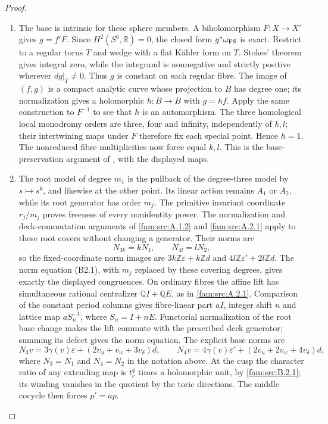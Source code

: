 \begin{proof}
\begin{enumerate}[label=\arabic*.,leftmargin=*]
\item The base is intrinsic for these sphere members. A biholomorphism $F:X\to X'$ gives $g=f'F$. Since $H^2(S^6,\mathbb R)=0$, the closed form $g^*\omega_{\rm FS}$ is exact. Restrict to a regular torus $T$ and wedge with a flat K\"ahler form on $T$. Stokes' theorem gives integral zero, while the integrand is nonnegative and strictly positive wherever $dg|_T\ne0$. Thus $g$ is constant on each regular fibre. The image of $(f,g)$ is a compact analytic curve whose projection to $B$ has degree one; its normalization gives a holomorphic $h:B\to B$ with $g=hf$. Apply the same construction to $F^{-1}$ to see that $h$ is an automorphism. The three homological local monodromy orders are three, four and infinity, independently of $k,l$; their intertwining maps under $F$ therefore fix each special point. Hence $h=1$. The nonreduced fibre multiplicities now force equal $k,l$. This is the base-preservation argument of \cite[Proposition~4.7, pp.~14--15]{ViaclovskyLog2026}, with the displayed maps.

\item The root model of degree $m_1$ is the pullback of the degree-three model by $s\mapsto s^k$, and likewise at the other point. Its linear action remains $A_1$ or $A_2$, while its root generator has order $m_j$. The primitive invariant coordinate $r_j/m_j$ proves freeness of every nonidentity power. The normalization and deck-commutation arguments of \ref{fam:src:A.1.2} and \ref{fam:src:A.2.1} apply to these root covers without changing a generator. Their norms are
\[
 N_{3k}=kN_1,\qquad N_{4l}=lN_2,
\]
so the fixed-coordinate norm images are $3k\mathbb Z\varepsilon+k\mathbb Zd$ and $4l\mathbb Z\varepsilon'+2l\mathbb Zd$. The norm equation (B2.1), with $m_j$ replaced by these covering degrees, gives exactly the displayed congruences. On ordinary fibres the affine lift has simultaneous rational centralizer
$\mathbb Q I+\mathbb Q E$, as in \cref{fam:src:A.2.1}.
Comparison of the constant period columns gives fibre-linear part $aI$,
integer shift $n$ and lattice map $aS_n^{-1}$, where $S_n=I+nE$.
Functorial normalization of the root base change makes the lift commute
with the prescribed deck generator; summing its defect gives the norm
equation. The explicit base norms are
\[
 N_3v=3\gamma(v)\varepsilon+(2v_u+v_w+3v_\delta)d,\qquad
 N_4v=4\gamma(v)\varepsilon'+(2v_u+2v_w+4v_\delta)d,
\]
where $N_3=N_1$ and $N_4=N_2$ in the notation above.
At the cusp the character ratio of any extending map is $t_c^q$ times
a holomorphic unit, by \cref{fam:src:B.2.1}; its winding vanishes in
the quotient by the toric directions. The middle cocycle then forces
$p'=ap$.


\end{enumerate}
\end{proof}
